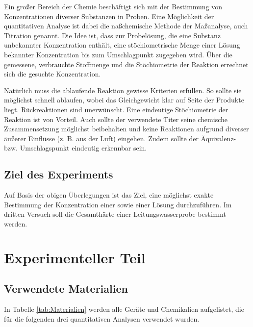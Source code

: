 \documentclass{article}
\begin{document}
      Ein großer Bereich der Chemie beschäftigt sich mit der Bestimmung von Konzentrationen diverser Substanzen in Proben. Eine Möglichkeit der quantitativen Analyse ist dabei die naßchemische Methode der Maßanalyse, auch Titration genannt. Die Idee ist, dass zur Probelösung, die eine Substanz unbekannter Konzentration enthält, eine stöchiometrische Menge einer Lösung bekannter Konzentration bis zum Umschlagpunkt zugegeben wird. Über die gemessene, verbrauchte Stoffmenge und die Stöchiometrie der Reaktion errechnet sich die gesuchte Konzentration.
      
      Natürlich muss die ablaufende Reaktion gewisse Kriterien erfüllen. So sollte sie möglichst schnell ablaufen, wobei das Gleichgewicht klar auf Seite der Produkte liegt. Rückreaktionen sind unerwünscht. Eine eindeutige Stöchiometrie der Reaktion ist von Vorteil. Auch sollte der verwendete Titer  seine chemische Zusammensetzung möglichst beibehalten und keine Reaktionen aufgrund diverser äußerer Einflüsse (z. B.  aus der Luft) eingehen. Zudem sollte der Äquivalenz- bzw. Umschlagspunkt eindeutig erkennbar sein. 
      
    \subsection{Ziel des Experiments}
    
      Auf Basis der obigen Überlegungen ist das Ziel, eine möglichst exakte Bestimmung der Konzentration einer  sowie einer  Lösung durchzuführen. Im dritten Versuch soll die Gesamthärte einer Leitungswasserprobe bestimmt werden.
    
  \section{Experimenteller Teil}
  
    \subsection{Verwendete Materialien}
      
      In Tabelle \ref{tab:Materialien} werden alle Geräte und Chemikalien aufgelistet, die für die folgenden drei quantitativen Analysen verwendet wurden. 
      
\end{document}
